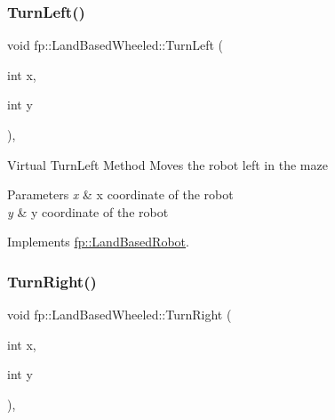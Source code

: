 \mbox{\label{classfp_1_1_land_based_wheeled_ad7e32884e0747b347d5d74db171c2854}} 
\subsubsection{\texorpdfstring{Turn\+Left()}{TurnLeft()}}
{\footnotesize\ttfamily void fp\+::\+Land\+Based\+Wheeled\+::\+Turn\+Left (\begin{DoxyParamCaption}\item[{int}]{x,  }\item[{int}]{y }\end{DoxyParamCaption})\hspace{0.3cm}{\ttfamily [override]}, {\ttfamily [virtual]}}

Virtual Turn\+Left Method Moves the robot left in the maze 
\begin{DoxyParams}{Parameters}
{\em x} & x coordinate of the robot \\
\hline
{\em y} & y coordinate of the robot \\
\hline
\end{DoxyParams}


Implements \hyperlink{classfp_1_1_land_based_robot_a359e1012e9093475b7a1b0d38e41a118}{fp\+::\+Land\+Based\+Robot}.

\mbox{\label{classfp_1_1_land_based_wheeled_a759f28e9ca00e77cc0e2f2ce2f524811}} 
\subsubsection{\texorpdfstring{Turn\+Right()}{TurnRight()}}
{\footnotesize\ttfamily void fp\+::\+Land\+Based\+Wheeled\+::\+Turn\+Right (\begin{DoxyParamCaption}\item[{int}]{x,  }\item[{int}]{y }\end{DoxyParamCaption})\hspace{0.3cm}{\ttfamily [override]}, {\ttfamily [virtual]}}


